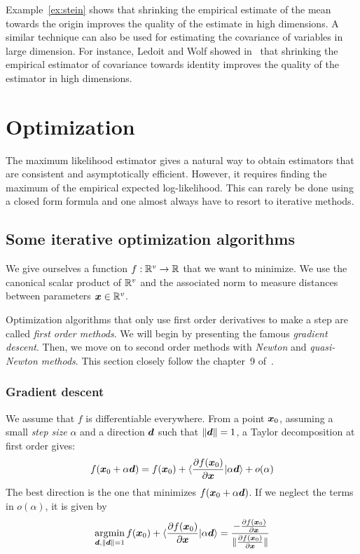 Example~\ref{ex:stein} shows that shrinking the empirical estimate of the mean towards the
origin improves the quality of the estimate in high dimensions. A similar technique can also be used for
estimating the covariance of variables in large dimension. For instance, Ledoit
and Wolf showed in~\cite{ledoit2004well} that shrinking the empirical estimator
of covariance towards identity improves the quality of the estimator in high dimensions.

\section{Optimization}
The maximum likelihood estimator gives a natural way to obtain estimators that
are consistent and asymptotically efficient.
However, it requires finding the maximum of the empirical expected
log-likelihood.
This can rarely be done using a closed form formula and one almost always have
to resort to iterative methods.


\subsection{Some iterative optimization algorithms}
We give ourselves a function $f: \mathbb{R}^v \rightarrow \mathbb{R}$ that we
want to minimize. We use the canonical scalar product of $\mathbb{R}^v$ and the
associated norm to measure distances between parameters $\boldsymbol{x} \in \mathbb{R}^v$.


Optimization algorithms that only use first order derivatives to make a step are
called \emph{first order methods}. We will begin by presenting the famous
\emph{gradient descent}. Then, we move on to second order methods with \emph{Newton} and
\emph{quasi-Newton methods}. This section closely follow the chapter~9 of~\cite{boyd2004convex}.

\subsubsection{Gradient descent}
\label{sec:gd}
We assume that $f$ is differentiable everywhere.
From a point $\boldsymbol{x}_0$, assuming a small \emph{step size} $\alpha$ and a direction
$\boldsymbol{d}$ such that $\|\boldsymbol{d}\| = 1$, a Taylor decomposition at first order gives:
\begin{align}
f(\boldsymbol{x}_0 + \alpha \boldsymbol{d}) = f(\boldsymbol{x}_0) + \langle \frac{ \partial f(\boldsymbol{x}_0)}{\partial \boldsymbol{x}} | \alpha \boldsymbol{d} \rangle + o(\alpha) 
\end{align}
The best direction is the one that minimizes $f(\boldsymbol{x}_0 + \alpha \boldsymbol{d})$. If we
neglect the terms in $o(\alpha)$, it is given by
\begin{align}
  \operatorname*{argmin}_{\boldsymbol{d}, \|\boldsymbol{d}\| = 1} f(\boldsymbol{x}_0) + \langle \frac{ \partial f(\boldsymbol{x}_0)}{\partial \boldsymbol{x}} | \alpha \boldsymbol{d} \rangle = \frac{-\frac{ \partial f(\boldsymbol{x}_0)}{\partial \boldsymbol{x}}}{\|\frac{ \partial f(\boldsymbol{x}_0)}{\partial \boldsymbol{x}}\|}
\end{align}

